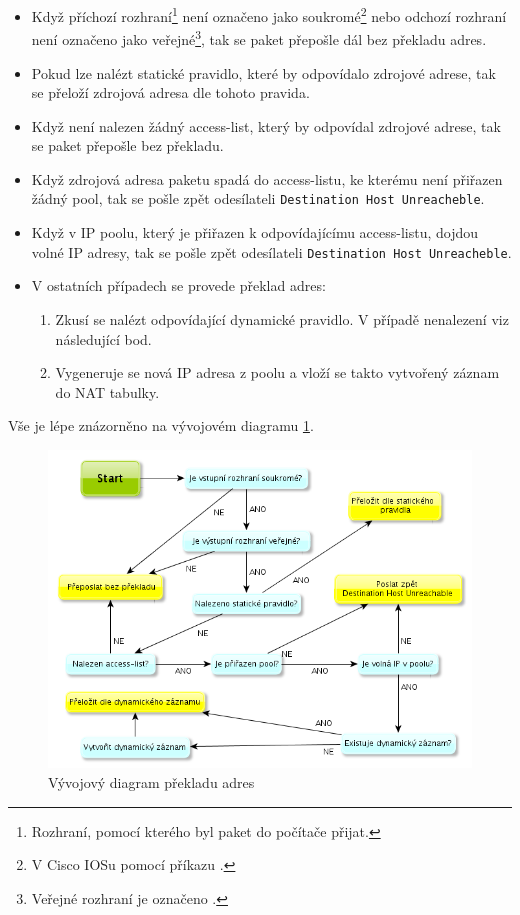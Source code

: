 \begin{itemize}
\item Když příchozí rozhraní\footnote{Rozhraní, pomocí kterého byl paket do počítače přijat.} není označeno jako soukromé\footnote{V Cisco IOSu pomocí příkazu .} nebo odchozí rozhraní není označeno jako veřejné\footnote{Veřejné rozhraní je označeno .}, tak se paket přepošle dál bez překladu adres.

\item Pokud lze nalézt statické pravidlo, které by odpovídalo zdrojové adrese, tak se přeloží zdrojová adresa dle tohoto pravida.

\item Když není nalezen žádný access-list, který by odpovídal zdrojové adrese, tak se paket přepošle bez překladu.

\item Když zdrojová adresa paketu spadá do access-listu, ke kterému není přiřazen žádný pool, tak se pošle zpět odesílateli \verb|Destination Host Unreacheble|.

\item Když v IP poolu, který je přiřazen k odpovídajícímu access-listu, dojdou volné IP adresy, tak se pošle zpět odesílateli \verb|Destination Host Unreacheble|.

\item V ostatních případech se provede překlad adres:
    \begin{enumerate}
    \item Zkusí se nalézt odpovídající dynamické pravidlo. V případě nenalezení viz následující bod.
    \item Vygeneruje se nová IP adresa z poolu a vloží se takto vytvořený záznam do NAT tabulky.
    \end{enumerate}
\end{itemize}

Vše je lépe znázorněno na vývojovém diagramu \ref{fig:nat_decision}.

\begin{figure}[b]
\begin{center}
\includegraphics[width=16cm]{figures/nat_decision}
\caption{Vývojový diagram překladu adres}
\label{fig:nat_decision}
\end{center}
\end{figure}

